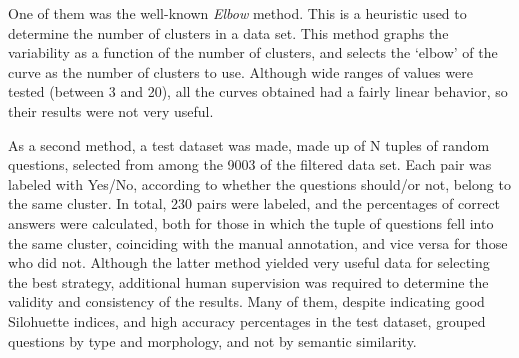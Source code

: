 One of them was the well-known \emph{Elbow} method. This is a heuristic used to determine the number of clusters in a data set. This method graphs the variability as a function of the number of clusters, and selects the `elbow' of the curve as the number of clusters to use. Although wide ranges of values were tested (between 3 and 20), all the curves obtained had a fairly linear behavior, so their results were not very useful.

As a second method, a test dataset was made, made up of N tuples of random questions, selected from among the 9003 of the filtered data set. Each pair was labeled with Yes/No, according to whether the questions should/or not, belong to the same cluster.
In total, 230 pairs were labeled, and the percentages of correct answers were calculated, both for those in which the tuple of questions fell into the same cluster, coinciding with the manual annotation, and vice versa for those who did not.
Although the latter method yielded very useful data for selecting the best strategy, additional human supervision was required to determine the validity and consistency of the results. Many of them, despite indicating good Silohuette indices, and high accuracy percentages  in the test dataset, grouped questions by type and morphology, and not by semantic similarity.

